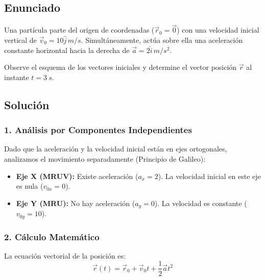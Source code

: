 \documentclass[12pt, a4paper]{article}
\begin{document}
\subsection*{Enunciado}
Una partícula parte del origen de coordenadas ($\vec{r}_0 = \vec{0}$) con una velocidad inicial vertical de $\vec{v}_0 = 10\hat{j} \, \si{m/s}$. Simultáneamente, actúa sobre ella una aceleración constante horizontal hacia la derecha de $\vec{a} = 2\hat{i} \, \si{m/s^2}$. 

Observe el esquema de los vectores iniciales y determine el vector posición $\vec{r}$ al instante $t = \SI{3}{s}$.

\begin{center}
\end{center}

\subsection*{Solución}

\subsubsection*{1. Análisis por Componentes Independientes}
Dado que la aceleración y la velocidad inicial están en ejes ortogonales, analizamos el movimiento separadamente (Principio de Galileo):

\begin{itemize}
    \item \textbf{Eje X (MRUV):} Existe aceleración ($a_x = 2$). La velocidad inicial en este eje es nula ($v_{0x} = 0$).
    \item \textbf{Eje Y (MRU):} No hay aceleración ($a_y = 0$). La velocidad es constante ($v_{0y} = 10$).
\end{itemize}

\subsubsection*{2. Cálculo Matemático}
La ecuación vectorial de la posición es:
$$ \vec{r}(t) = \vec{r}_0 + \vec{v}_0 t + \frac{1}{2}\vec{a}t^2 $$
\end{document}
